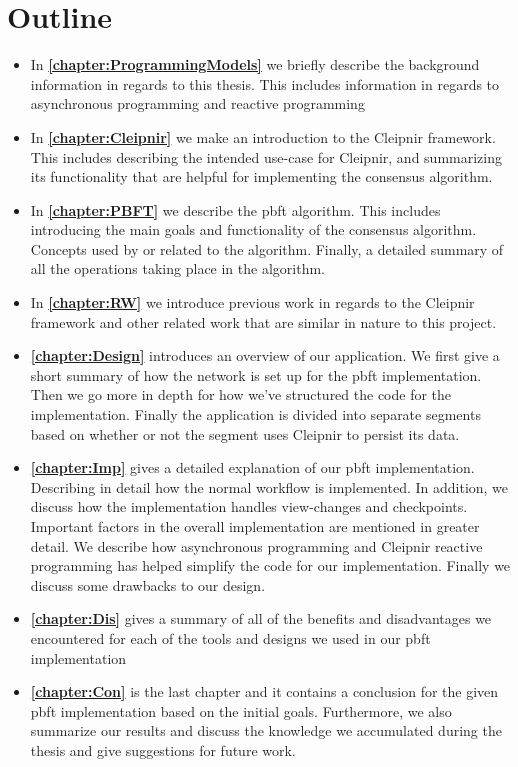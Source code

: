 \section{Outline}
\begin{itemize}
\item In \textbf{\autoref{chapter:ProgrammingModels}} we briefly describe the background information in regards to this thesis. This includes information in regards to asynchronous programming and reactive programming

\item In \textbf{\autoref{chapter:Cleipnir}} we make an introduction to the Cleipnir framework. This includes describing the intended use-case for Cleipnir, and summarizing its functionality that are helpful for implementing the consensus algorithm.

\item In \textbf{\autoref{chapter:PBFT}} we describe the \ac{pbft} algorithm. This includes introducing the main goals and functionality of the consensus algorithm. Concepts used by or related to the algorithm. Finally, a detailed summary of all the operations taking place in the algorithm.

\item In \textbf{\autoref{chapter:RW}} we introduce previous work in regards to the Cleipnir framework and other related work that are similar in nature to this project.

\item \textbf{\autoref{chapter:Design}} introduces an overview of our application. We first give a short summary of how the network is set up for the \ac{pbft} implementation. Then we go more in depth for how we’ve structured the code for the implementation. Finally the application is divided into separate segments based on whether or not the segment uses Cleipnir to persist its data.

\item \textbf{\autoref{chapter:Imp}} gives a detailed explanation of our \ac{pbft} implementation. Describing in detail how the normal workflow is implemented. In addition, we discuss how the implementation handles view-changes and checkpoints.  Important factors in the overall implementation are mentioned in greater detail. We describe how asynchronous programming and Cleipnir reactive programming has helped simplify the code for our implementation. Finally we discuss some drawbacks to our design.

\item \textbf{\autoref{chapter:Dis}} gives a summary of all of the benefits and disadvantages we encountered for each of the tools and designs we used in our \ac{pbft} implementation %

\item \textbf{\autoref{chapter:Con}} is the last chapter and it contains a conclusion for the given \ac{pbft} implementation based on the initial goals. Furthermore, we also summarize our results and discuss the knowledge we accumulated during the thesis and give suggestions for future work.
\end{itemize}
